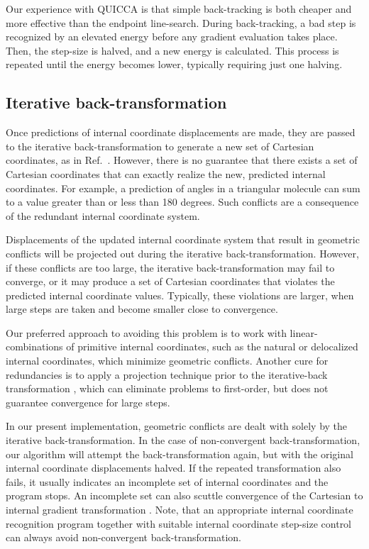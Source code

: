 \documentclass[prl,twocolumn,showpacs,twocolumngrid,superbib]{revtex4}
\begin{document}
Our experience with QUICCA is that simple back-tracking is both cheaper and more effective
than the endpoint line-search.  During back-tracking, a  bad step is recognized by an elevated
energy before any gradient evaluation takes place. Then, the step-size is halved,
and a new energy is calculated.  This process is repeated until the energy becomes lower,
typically requiring just one halving.

\subsection{Iterative back-transformation}\label{transformation}

Once predictions of internal coordinate displacements are made, they are passed to the 
iterative back-transformation to generate a new set of Cartesian coordinates, as in 
Ref.~\cite{pulay_review}.   However, there is no guarantee that there exists a set of 
Cartesian coordinates that can exactly realize the new, predicted internal coordinates.  
For example, a prediction of angles in a triangular molecule can sum 
to a value greater than or less than 180 degrees. Such conflicts are a consequence of 
the redundant internal coordinate system.  

Displacements
of the updated internal coordinate system that result in geometric conflicts 
will be projected out during the iterative back-transformation. However, if 
these conflicts are too large, the iterative back-transformation may fail to converge,
or it may produce a set of Cartesian coordinates that violates the predicted internal 
coordinate values. Typically, these violations are larger, when large steps are
taken and become smaller close to convergence.

Our preferred approach to avoiding this problem is to work with linear-combinations of primitive internal
coordinates, such as the natural \cite{Pulay_natural_internals} or delocalized
\cite{Baker_deloc_1} internal coordinates, which minimize geometric conflicts.  
Another cure for redundancies is to apply a projection technique prior to the iterative-back 
transformation \cite{pulay_review}, which can eliminate problems to first-order, but does not 
guarantee convergence for large steps.

In our present implementation, geometric conflicts are dealt with solely by the iterative back-transformation.
In the case of non-convergent back-transformation,  our algorithm will attempt the back-transformation
again, but with the original internal coordinate displacements halved.  If the repeated transformation 
also fails, it usually indicates an incomplete set
of internal coordinates 
and the program stops.  An incomplete 
set can also scuttle convergence of the Cartesian to internal gradient transformation \cite{nemeth_coordtrf1}. 
Note, that an appropriate internal coordinate recognition program 
together with suitable internal coordinate step-size control
can always avoid non-convergent back-transformation.
\end{document}
